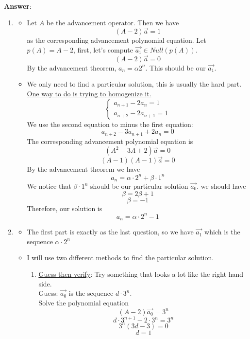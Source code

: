 \noindent\textbf{Answer}:\\
\begin{enumerate}
    \item \begin{itemize}
        \item Let $A$ be the advancement operator. Then we have $$(A-2)\vec{a}=1$$ as the corresponding advancement polynomial equation.
        Let $p(A)=A-2$, first, let's compute $\vec{a_1} \in Null(p(A))$.
        $$(A-2)\vec{a}=0$$
        By the advancement theorem, $a_n=\alpha2^n$. This should be our $\vec{a_1}$.
        \item We only need to find a particular solution, this is usually the hard part.\\
        \underline{One way to do is trying to homogenize it.}
        \begin{equation}
            \begin{cases}
                a_{n+1}-2a_n=1\\
                a_{n+2}-2a_{n+1}=1
            \end{cases}
        \end{equation}
        We use the second equation to minus the first equation:
        $$a_{n+2}-3a_{n+1}+2a_n=0$$
        The corresponding advancement polynomial equation is
        $$(A^2-3A+2)\vec{a}=0$$ $$(A-1)(A-1)\vec{a}=0$$
        By the advancement theorem we have $$a_n=\alpha \cdot 2^n+\beta \cdot 1^n$$
        We notice that $\beta \cdot 1^n$ should be our particular solution $\vec{a_0}$. we should have 
        $$\beta=2\beta+1$$ $$\beta=-1$$
        Therefore, our solution is 
        $$a_n=\alpha \cdot 2^n-1$$
    \end{itemize}
    \item \begin{itemize}
        \item The first part is exactly as the last question, so we have $\vec{a_1}$ which is the sequence $\alpha \cdot 2^n$
        \item I will use two different methods to find the particular solution.
        \begin{enumerate}
            \item \underline{Guess then verify}: Try something that looks a lot like the right hand side.\\
            Guess: $\vec{a_0}$ is the sequence $d \cdot 3^n$.\\
            Solve the polynomial equation $$(A-2)\vec{a_0}=3^n$$ $$d \cdot 3^{n+1}-2 \cdot 3^n=3^n$$ $$3^n(3d-3)=0$$ $$d=1$$

\end{enumerate}
\end{itemize}
\end{enumerate}
